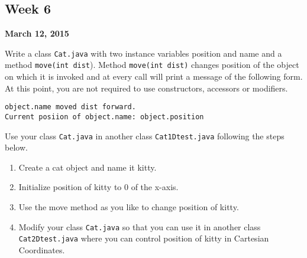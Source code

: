 \documentclass[12pt,letterpaper,twoside]{article}
\begin{document}




\subsection*{Week 6}
\hfill \textbf{March 12, 2015}

Write a class \texttt{Cat.java} with two instance variables position and name and a method \texttt{move(int dist}). Method \texttt{move(int dist)} changes position of the object on which it is invoked and at every call will print a message of the following form. At this point, you are not required to use constructors, accessors or modifiers.

\begin{verbatim}
object.name moved dist forward.
Current posiion of object.name: object.position
\end{verbatim}

Use your class \texttt{Cat.java} in another class \texttt{Cat1Dtest.java} following the steps below.

\begin{enumerate}[itemsep=0pt]
\item Create a cat object and name it kitty.
\item Initialize position of kitty to 0 of the x-axis.
\item Use the move method as you like to change position of kitty.
\item Modify your class \texttt{Cat.java} so that you can use it in another class \texttt{Cat2Dtest.java} where you can control position of kitty in Cartesian Coordinates.
\end{enumerate}
\end{document}
